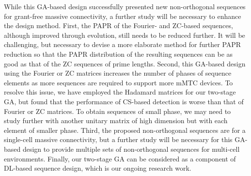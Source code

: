 \documentclass[journal]{IEEEtran}
\numberwithin{const2}{const}
\begin{document}
 
While this GA-based design successfully presented new 
non-orthogonal sequences  
for grant-free massive connectivity,
a further study will be necessary to enhance the design method.
First, the PAPR of the Fourier- and ZC-based sequences, although improved through evolution,
still needs to be reduced further.
It will be challenging, but necessary to devise 
a more elaborate method for further PAPR reduction
so that the PAPR distribution of the resulting sequences can be as good as that of the ZC sequences of prime lengths.
Second, this GA-based design using the Fourier or ZC matrices increases the number of phases of 
sequence elements as more sequences are required to support more mMTC devices.
To resolve this issue, we have employed the Hadamard matrices for our two-stage GA,
but found that the performance of CS-based detection is worse than that of Fourier or ZC matrices.
To obtain sequences of small phase,
we may need to study further with another unitary matrix 
of high dimension but with each element of smaller phase. 
Third, the proposed non-orthogonal sequences are for a single-cell massive connectivity,
but a further study will be necessary for this GA-based design %
to provide multiple sets of non-orthogonal sequences 
for multi-cell environments.
Finally, %
our two-stage GA can be considered 
as a component of DL-based sequence design, 
which is our ongoing research work.







\end{document}
